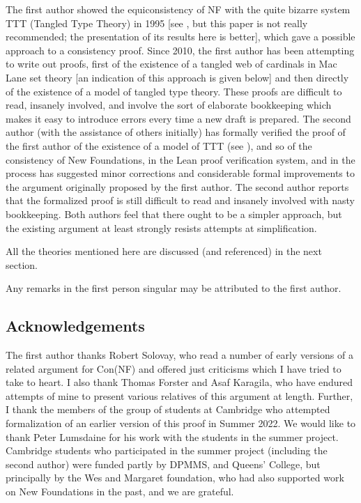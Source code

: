 \documentclass[112pt]{article}
\theoremstyle{definition}
\theoremstyle{remark}
\begin{document}
The first author showed the equiconsistency of NF with the quite bizarre system TTT (Tangled Type Theory) in 1995 [see \cite{tangled}, but this paper is not really recommended; the presentation of its results here is better], which gave a possible approach to a consistency proof.  Since 2010, the first author has been attempting to write out proofs, first of the existence of a tangled web of cardinals in Mac Lane set theory [an indication of this approach is given below] and then directly of the existence of a model of tangled type theory.  These proofs are difficult to read, insanely involved, and involve the sort of elaborate bookkeeping which makes it easy to introduce errors every time a new draft is prepared.  The second author (with the assistance of others initially)
has formally verified the proof of the first author of the existence of a model of TTT (see \cite{wilshaw}), and so of the consistency of New Foundations, in the Lean proof verification system, and in the process has suggested minor corrections and considerable formal improvements to the argument originally proposed by the first author.  The second author reports that the formalized proof is still difficult to read and insanely involved with nasty bookkeeping.  Both authors feel that there ought to be a simpler approach, but the existing argument at least strongly resists attempts at simplification.

All the theories mentioned here are discussed (and referenced) in the next section.

Any remarks in the first person singular may be attributed to the first author.

\subsection{Acknowledgements}

The first author thanks Robert Solovay, who read a number of early versions of a related argument for Con(NF) and offered just criticisms which I have tried to take to heart.  I also thank Thomas Forster and Asaf Karagila, who have endured attempts of mine to present various relatives of this argument at length.  Further, I thank the members of the group of students at Cambridge who attempted formalization of an earlier version of this proof in Summer 2022.  We would like to thank Peter Lumsdaine for his work with the students in the summer project.   Cambridge students who participated in the summer project (including the second author) were funded partly by DPMMS, and Queens' College, but principally by the Wes and Margaret foundation, who had also supported work on New Foundations in the past, and we are grateful.
\end{document}
